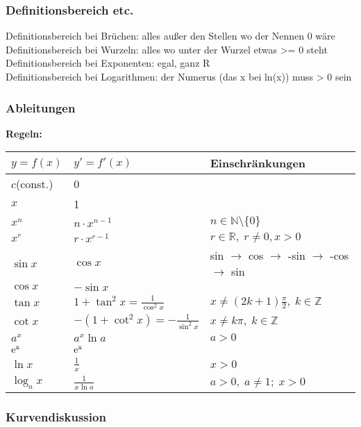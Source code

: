 \documentclass[6pt,a4paper]{scrartcl}
\begin{document}
\begin{multicols*}{2}
\subsubsection{Definitionsbereich etc.}
Definitionsbereich bei Brüchen: alles außer den Stellen wo der Nennen 0 wäre \\
Definitionsbereich bei Wurzeln: alles wo unter der Wurzel etwas >= 0 steht \\
Definitionsbereich bei Exponenten: egal, ganz R \\
Definitionsbereich bei Logarithmen: der Numerus (das x bei ln(x)) muss > 0 sein \\

\subsubsection{Ableitungen}
\textbf{Regeln:}\\
\begin{tabular}{l|l|l}
$ y=f(x) $		& $ y'=f'(x) $ 								& Einschränkungen 									\\
\hline
$ c $(const.)	& 0 																								\\	
$ x $			& 1																								\\
$ x^n $			& $ n \cdot x^{n-1} $						& $ n \in \mathbb N \setminus \{0\} $ 				\\
$ x^r $			& $ r \cdot x^{r-1} $						& $ r \in \mathbb R, \; r \neq 0, x>0 $ 				\\
$ \sin x $		& $ \cos x $ 								& sin $\rightarrow$ cos $\rightarrow$ -sin $\rightarrow$ -cos $\rightarrow$ sin\\	
$ \cos x $		& $ -\sin x $ 								&													\\
$ \tan x $		& $ 1+ \tan^2 x = \frac{1}{\cos^2 x} $		& $ x \neq (2k+1)\frac{\pi}{2}, \; k \in \mathbb Z $ 	\\
$ \cot x $		& $ -(1+ \cot^2 x) = - \frac{1}{\sin^2 x} $	& $ x \neq k \pi, \; k \in \mathbb Z $ 				\\
$ a^x $			& $ a^x \ln a $								& $ a>0 $ 											\\
$ \rm e^x $		& $ \rm e^x $ 								&													\\	
$ \ln x $		& $ \frac{1}{x} $							& $ x>0 $ 											\\
$ \log_a x $		& $ \frac{1}{x \ln a} $						& $ a>0, \; a \neq 1; \; x>0 $ 						\\
\end{tabular}

\subsubsection{Kurvendiskussion}


\end{multicols*}
\end{document}

